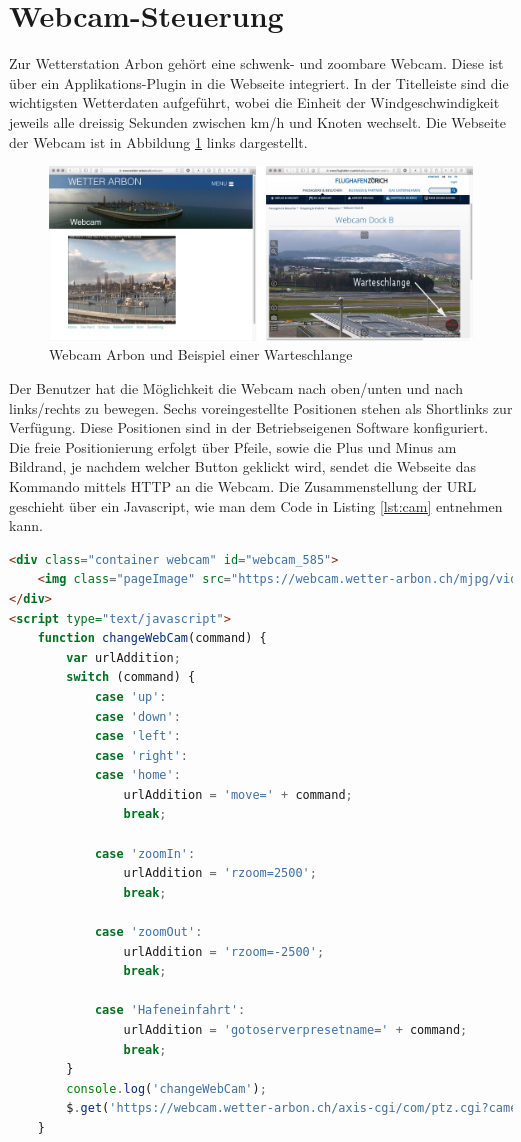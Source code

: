 \section{Webcam-Steuerung}
Zur Wetterstation Arbon gehört eine schwenk- und zoombare Webcam. Diese ist über ein Applikations-Plugin in die Webseite integriert. In der Titelleiste sind die wichtigsten Wetterdaten aufgeführt, wobei die Einheit der Windgeschwindigkeit jeweils alle dreissig Sekunden zwischen km/h und Knoten wechselt. Die Webseite der Webcam ist in Abbildung \ref{img:warteschlange} links dargestellt.

\begin{figure}[h]
	\centering
	\includegraphics[width=1\linewidth]{img/warteschlange}
	\caption{Webcam Arbon und Beispiel einer Warteschlange}
	\label{img:warteschlange}
\end{figure}


Der Benutzer hat die Möglichkeit die Webcam nach oben/unten und nach links/rechts zu bewegen. Sechs voreingestellte Positionen stehen als Shortlinks zur Verfügung. Diese Positionen sind in der Betriebseigenen Software konfiguriert. Die freie Positionierung erfolgt über Pfeile, sowie die Plus und Minus am Bildrand, je nachdem welcher Button geklickt wird, sendet die Webseite das Kommando mittels HTTP an die Webcam. Die Zusammenstellung der URL geschieht über ein Javascript, wie man dem Code in Listing \ref{lst:cam} entnehmen kann.

\begin{lstlisting}[caption={Positionsänderung der Webcam},label={lst:cam},language=html]
 <div class="container webcam" id="webcam_585">
	<img class="pageImage" src="https://webcam.wetter-arbon.ch/mjpg/video.mjpg"/>
</div>
<script type="text/javascript">
	function changeWebCam(command) {
		var urlAddition;
		switch (command) {
			case 'up':
			case 'down':
			case 'left':
			case 'right':
			case 'home':
				urlAddition = 'move=' + command;
				break;
				
			case 'zoomIn':
				urlAddition = 'rzoom=2500';
				break;
				
			case 'zoomOut':
				urlAddition = 'rzoom=-2500';
				break;
				
			case 'Hafeneinfahrt':
				urlAddition = 'gotoserverpresetname=' + command;
				break;		
		}
		console.log('changeWebCam');
		$.get('https://webcam.wetter-arbon.ch/axis-cgi/com/ptz.cgi?camera=1&' + urlAddition);
	}
\end{lstlisting}


